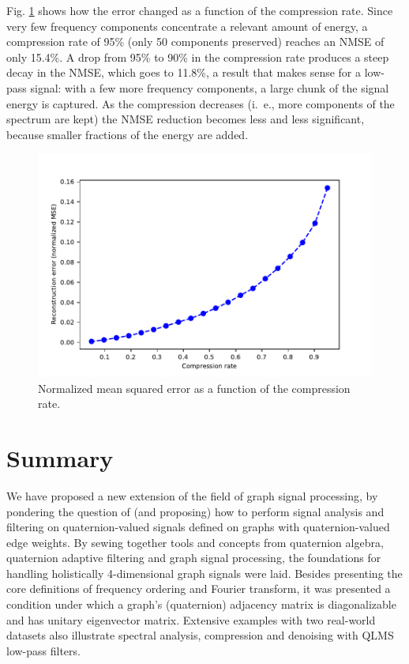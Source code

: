 Fig. \ref{fig:mse_values} shows how the error changed as a function of the compression rate. Since very few frequency components concentrate a relevant amount of energy, a compression rate of 95\% (only 50 components preserved) reaches an NMSE of only 15.4\%. A drop from 95\% to 90\% in the compression rate produces a steep decay in the NMSE, which goes to 11.8\%, a result that makes sense for a low-pass signal: with a few more frequency components, a large chunk of the signal energy is captured. As the compression decreases (i.~e., more components of the spectrum are kept) the NMSE reduction becomes less and less significant, because smaller fractions of the energy are added.

\begin{figure}
    \centering
    \includegraphics[width=0.7\linewidth]{Figures/usa_example/mse_values.pdf}
    \caption{Normalized mean squared error as a function of the compression rate.}
    \label{fig:mse_values}
\end{figure}

\section{Summary}

We have proposed a new extension of the field of graph signal processing, by pondering the question of (and proposing) how to perform signal analysis and filtering on quaternion-valued signals defined on graphs with quaternion-valued edge weights. By sewing together tools and concepts from quaternion algebra, quaternion adaptive filtering and graph signal processing, the foundations for handling holistically 4-dimensional graph signals were laid. Besides presenting the core definitions of frequency ordering and Fourier transform,
it was presented a condition under which a graph's (quaternion) adjacency matrix is diagonalizable and has unitary eigenvector matrix. Extensive examples with two real-world datasets also illustrate spectral analysis, compression and denoising with QLMS low-pass filters.
